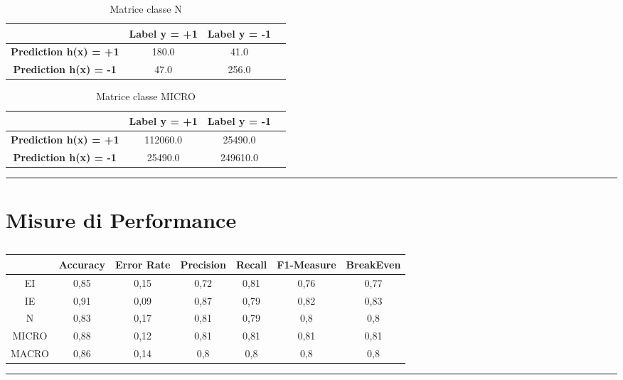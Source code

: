\documentclass[12pt]{amsart}
\begin{document}
 \begin{table}[h]
\begin{tabular}{|c||c|c|c|}
\hline & {\bf{Label y = +1}}  & {\bf{Label y = -1}} \\ 
 \hline \hline 
{\bf{Prediction h(x) = +1}} &180.0&41.0\\ 
 \hline 
{\bf{Prediction h(x) = -1}} &47.0&256.0\\ 
 \hline 
\end{tabular}
\caption{Matrice classe N}
\end{table}

 \begin{table}[h]
\begin{tabular}{|c||c|c|c|}
\hline & {\bf{Label y = +1}}  & {\bf{Label y = -1}} \\ 
 \hline \hline 
{\bf{Prediction h(x) = +1}} &112060.0&25490.0\\ 
 \hline 
{\bf{Prediction h(x) = -1}} &25490.0&249610.0\\ 
 \hline 
\end{tabular}
\caption{Matrice classe MICRO}
\end{table}

 \rule{1.12\linewidth}{0.1mm} 
\section*{\bf{Misure di Performance}} 
 
 \begin{table}[h]
\begin{tabular}{ccccccc}
\hline 
& {\bf{Accuracy}}  & {\bf{Error Rate}} &{\bf{ Precision}} & {\bf{Recall}} & {\bf{F1-Measure}} &{\bf{ BreakEven}}  \\ 
\hline \hline 
EI&0,85&0,15&0,72&0,81&0,76&0,77 \\ 
IE&0,91&0,09&0,87&0,79&0,82&0,83 \\ 
N&0,83&0,17&0,81&0,79&0,8&0,8 \\ 
MICRO&0,88&0,12&0,81&0,81&0,81&0,81 \\ 
MACRO&0,86&0,14&0,8&0,8&0,8&0,8 \\ 
\end{tabular}
\caption{}
\end{table}

 \rule{1.12\linewidth}{0.1mm} 
\end{document}
